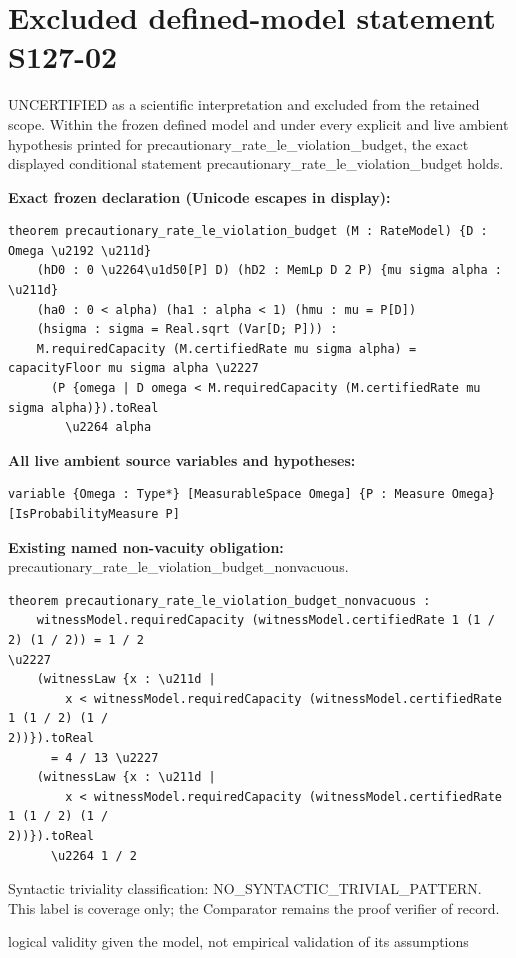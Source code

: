 \documentclass[11pt]{article}
\begin{document}
\section*{Excluded defined-model statement S127-02}
UNCERTIFIED as a scientific interpretation and excluded from the retained scope. Within the frozen defined model and under every explicit and live ambient hypothesis printed for precautionary\_\allowbreak{}rate\_\allowbreak{}le\_\allowbreak{}violation\_\allowbreak{}budget, the exact displayed conditional statement precautionary\_\allowbreak{}rate\_\allowbreak{}le\_\allowbreak{}violation\_\allowbreak{}budget holds.
\par\noindent\textbf{Exact frozen declaration (Unicode escapes in display):}
\begin{Verbatim}[breaklines=true,breakanywhere=true,fontsize=\scriptsize]
theorem precautionary_rate_le_violation_budget (M : RateModel) {D : Omega \u2192 \u211d}
    (hD0 : 0 \u2264\u1d50[P] D) (hD2 : MemLp D 2 P) {mu sigma alpha : \u211d}
    (ha0 : 0 < alpha) (ha1 : alpha < 1) (hmu : mu = P[D])
    (hsigma : sigma = Real.sqrt (Var[D; P])) :
    M.requiredCapacity (M.certifiedRate mu sigma alpha) = capacityFloor mu sigma alpha \u2227
      (P {omega | D omega < M.requiredCapacity (M.certifiedRate mu sigma alpha)}).toReal
        \u2264 alpha
\end{Verbatim}
\noindent\textbf{All live ambient source variables and hypotheses:}
\begin{Verbatim}[breaklines=true,breakanywhere=true,fontsize=\scriptsize]
variable {Omega : Type*} [MeasurableSpace Omega] {P : Measure Omega} [IsProbabilityMeasure P]
\end{Verbatim}
\noindent\textbf{Existing named non-vacuity obligation:} precautionary\_\allowbreak{}rate\_\allowbreak{}le\_\allowbreak{}violation\_\allowbreak{}budget\_\allowbreak{}nonvacuous.
\begin{Verbatim}[breaklines=true,breakanywhere=true,fontsize=\scriptsize]
theorem precautionary_rate_le_violation_budget_nonvacuous :
    witnessModel.requiredCapacity (witnessModel.certifiedRate 1 (1 / 2) (1 / 2)) = 1 / 2
\u2227
    (witnessLaw {x : \u211d |
        x < witnessModel.requiredCapacity (witnessModel.certifiedRate 1 (1 / 2) (1 /
2))}).toReal
      = 4 / 13 \u2227
    (witnessLaw {x : \u211d |
        x < witnessModel.requiredCapacity (witnessModel.certifiedRate 1 (1 / 2) (1 /
2))}).toReal
      \u2264 1 / 2
\end{Verbatim}
\noindent Syntactic triviality classification: NO\_\allowbreak{}SYNTACTIC\_\allowbreak{}TRIVIAL\_\allowbreak{}PATTERN. This label is coverage only; the Comparator remains the proof verifier of record.
\par\noindent logical validity given the model, not empirical validation of its assumptions
\end{document}
